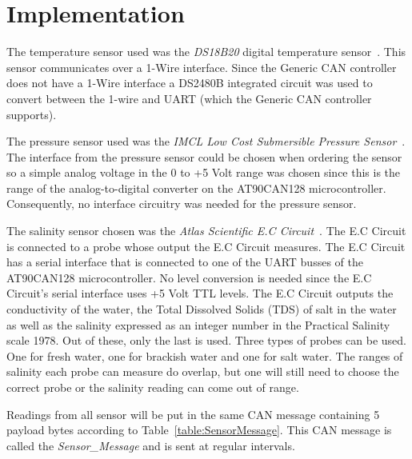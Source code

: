 
\section{Implementation}\label{sec:implementation}
The temperature sensor used was the \emph{DS18B20} digital temperature sensor~\cite{web:ds18b20}. This sensor communicates over a 1-Wire interface. Since the Generic CAN controller does not have a 1-Wire interface a DS2480B integrated circuit was used to convert between the 1-wire and UART (which the Generic CAN controller supports).

The pressure sensor used was the \emph{IMCL Low Cost Submersible Pressure Sensor}~\cite{web:imcl}. The interface from the pressure sensor could be chosen when ordering the sensor so a simple analog voltage in the 0 to +5 Volt range was chosen since this is the range of the analog-to-digital converter on the AT90CAN128 microcontroller. Consequently, no interface circuitry was needed for the pressure sensor.

The salinity sensor chosen was the \emph{Atlas Scientific E.C Circuit}~\cite{web:ec_circuit}. The E.C Circuit is connected to a probe whose output the E.C Circuit measures. The E.C Circuit has a serial interface that is connected to one of the UART busses of the AT90CAN128 microcontroller. No level conversion is needed since the E.C Circuit's serial interface uses +5 Volt TTL levels. \newline
The E.C Circuit outputs the conductivity of the water, the Total Dissolved Solids (TDS) of salt in the water as well as the salinity expressed as an integer number in the Practical Salinity scale 1978. Out of these, only the last is used. \newline
Three types of probes can be used. One for fresh water, one for brackish water and one for salt water. The ranges of salinity each probe can measure do overlap, but one will still need to choose the correct probe or the salinity reading can come out of range. 

Readings from all sensor will be put in the same CAN message containing 5 payload bytes according to Table~\ref{table:SensorMessage}. This CAN message is called the \emph{Sensor\_Message} and is sent at regular intervals.

